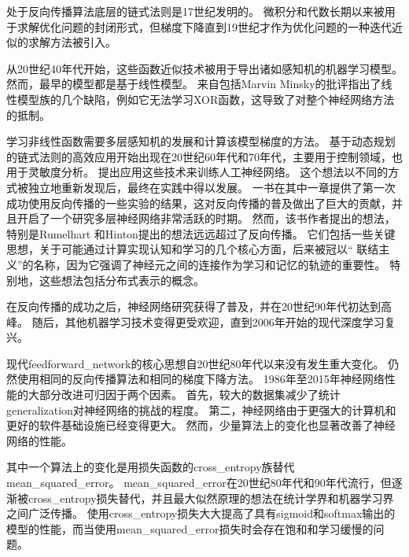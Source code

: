   
处于反向传播算法底层的链式法则是17世纪发明的\citep{Leibniz-1676,LHopital-1696}。
微积分和代数长期以来被用于求解优化问题的封闭形式，但梯度下降直到19世纪才作为优化问题的一种迭代近似的求解方法被引入\citep{cauchy1847}。

从20世纪40年代开始，这些函数近似技术被用于导出诸如感知机的机器学习模型。 
然而，最早的模型都是基于线性模型。 
来自包括Marvin Minsky的批评指出了线性模型族的几个缺陷，例如它无法学习XOR函数，这导致了对整个神经网络方法的抵制。

学习非线性函数需要多层感知机的发展和计算该模型梯度的方法。
基于动态规划的链式法则的高效应用开始出现在20世纪60年代和70年代，主要用于控制领域\citep{Kelley-1960,Bryson-et-al-1961,Dreyfus-1962,Bryson-1969,Dreyfus-1973}，也用于灵敏度分析\citep{Linnainmaa-1976}。 
\cite{Werbos-1981}提出应用这些技术来训练人工神经网络。
这个想法以不同的方式被独立地重新发现后\citep{LeCun85,Parker-1985,Rumelhart86b-small}，最终在实践中得以发展。
一书在其中一章提供了第一次成功使用反向传播的一些实验的结果\citep{Rumelhart86c}，这对反向传播的普及做出了巨大的贡献，并且开启了一个研究多层神经网络非常活跃的时期。
然而，该书作者提出的想法，特别是Rumelhart 和Hinton提出的想法远远超过了反向传播。
它们包括一些关键思想，关于可能通过计算实现认知和学习的几个核心方面，后来被冠以`` 联结主义''的名称，因为它强调了神经元之间的连接作为学习和记忆的轨迹的重要性。
特别地，这些想法包括分布式表示的概念\citep{Hinton-et-al-PDP1986}。

在反向传播的成功之后，神经网络研究获得了普及，并在20世纪90年代初达到高峰。 
随后，其他机器学习技术变得更受欢迎，直到2006年开始的现代深度学习复兴。

现代\gls{feedforward_network}的核心思想自20世纪80年代以来没有发生重大变化。
仍然使用相同的反向传播算法和相同的梯度下降方法。
1986年至2015年神经网络性能的大部分改进可归因于两个因素。
首先，较大的数据集减少了统计\gls{generalization}对神经网络的挑战的程度。
第二，神经网络由于更强大的计算机和更好的软件基础设施已经变得更大。
然而，少量算法上的变化也显著改善了神经网络的性能。
  
  
其中一个算法上的变化是用损失函数的\gls{cross_entropy}族替代\gls{mean_squared_error}。
\gls{mean_squared_error}在20世纪80年代和90年代流行，但逐渐被\gls{cross_entropy}损失替代，并且最大似然原理的想法在统计学界和机器学习界之间广泛传播。
使用\gls{cross_entropy}损失大大提高了具有\gls{sigmoid}和softmax输出的模型的性能，而当使用\gls{mean_squared_error}损失时会存在饱和和学习缓慢的问题。

